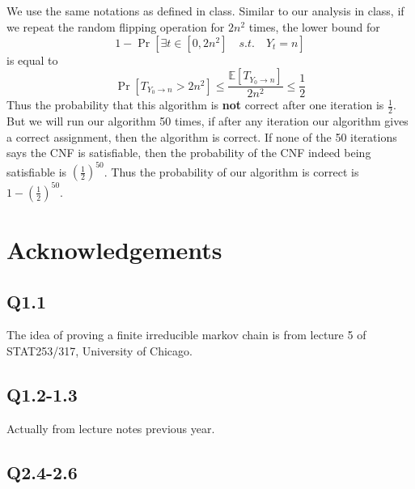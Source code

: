 \documentclass[12pt,letterpaper]{article}
\begin{document}
\subsection{}
We use the same notations as defined in class.
Similar to our analysis in class, 
if we repeat the random flipping operation for $2n^2$ times,
the lower bound for 
$$1-\Pr\left[\exists t\in [0,2n^2]\quad s.t.\quad Y_t=n\right]$$
is equal to 
$$\Pr\left[T_{Y_0\to n}>2n^2\right]\leq\frac{\mathbb{E}[T_{Y_0\to n}]}{2n^2}\leq\frac{1}{2}$$
Thus the probability that this algorithm is \textbf{not} correct 
after one iteration is $\frac{1}{2}$.
But we will run our algorithm 50 times, 
if after any iteration our algorithm gives a correct assignment,
then the algorithm is correct.
If none of the 50 iterations says the CNF is satisfiable,
then the probability of the CNF indeed being satisfiable is 
$(\frac{1}{2})^{50}$.
Thus the probability of our algorithm is correct is $1-(\frac{1}{2})^{50}$.



\newpage
\section{Acknowledgements}
\subsection*{Q1.1}
The idea of proving a finite irreducible markov chain is from lecture 5 of STAT253/317, University of Chicago.
\subsection*{Q1.2-1.3}
Actually from lecture notes previous year.
\subsection*{Q2.4-2.6}
\end{document}
